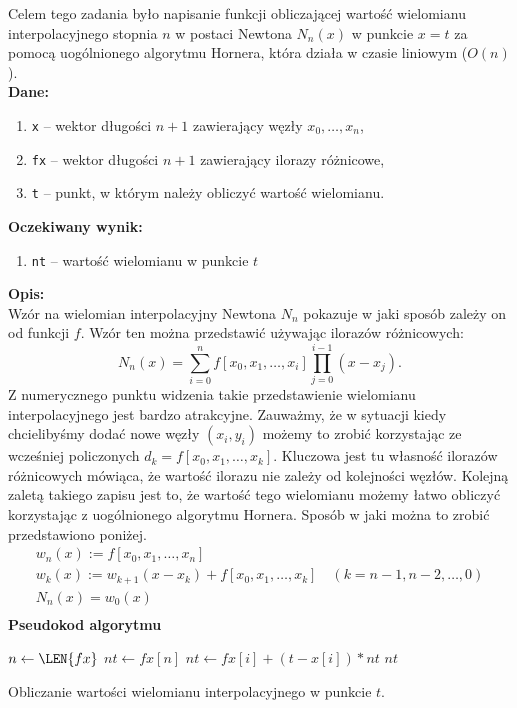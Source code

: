 \documentclass[]{article}
\begin{document}
	Celem tego zadania było napisanie funkcji obliczającej wartość wielomianu interpolacyjnego stopnia $n$ w postaci Newtona $N_{n}(x)$ w punkcie $x = t$ za pomocą uogólnionego algorytmu Hornera, która działa w czasie liniowym ($O(n)$). \\
	\textbf{Dane:}
	\begin{enumerate}[]
		\item \texttt{x} -- wektor długości $n+1$ zawierający węzły $x_0, \ldots, x_n$,
		\item \texttt{fx} -- wektor długości $n+1$ zawierający ilorazy różnicowe,
		\item \texttt{t} -- punkt, w którym należy obliczyć wartość wielomianu.
	\end{enumerate}
	\textbf{Oczekiwany wynik:}
	\begin{enumerate}[]
		\item \texttt{nt} -- wartość wielomianu w punkcie $t$
	\end{enumerate}
	\textbf{Opis:}\\
	\noindent Wzór na wielomian interpolacyjny Newtona $N_n$ pokazuje w jaki sposób zależy on od funkcji $f$. Wzór ten można przedstawić używając ilorazów różnicowych:
	$$N_n(x) = \sum_{i=0}^n f[x_0,x_{1}, \ldots, x_{i}] \prod_{j=0}^{i-1}(x-x_j).$$
	Z numerycznego punktu widzenia takie przedstawienie wielomianu interpolacyjnego jest bardzo atrakcyjne. Zauważmy, że w sytuacji kiedy chcielibyśmy dodać nowe węzły $(x_i, y_i)$ możemy to zrobić korzystając ze wcześniej policzonych $d_k = f[x_0,x_1, \ldots, x_k]$. Kluczowa jest tu własność ilorazów różnicowych mówiąca, że wartość ilorazu nie zależy od kolejności węzłów. Kolejną zaletą takiego zapisu jest to, że wartość tego wielomianu możemy łatwo obliczyć korzystając z uogólnionego algorytmu Hornera. Sposób w jaki można to zrobić przedstawiono poniżej.
	\begin{align*}
	&w_n(x) := f[x_0, x_1, \ldots, x_n]& \nonumber \\
	&w_k(x) := w_{k+1}(x-x_k)+ f[x_0, x_1, \ldots, x_k]	\quad(k=n-1, n-2, \ldots, 0)& \nonumber \\
	&N_n(x) = w_0(x) \nonumber \\
	\end{align*}
	\clearpage
	\noindent\textbf{Pseudokod algorytmu}\\
	\begin{algorithm}[h]
		\DontPrintSemicolon
		
		 {
			$n \gets \LEN{fx}$\;
			$nt \gets fx[n]$\;
			 {
				$nt \gets fx[i] + (t - x[i]) * nt$\; 		
			}
			\KwRet $nt$\;
		}
		\caption{Obliczanie wartości wielomianu interpolacyjnego w punkcie $t$.}
	\end{algorithm}			
	
\end{document}
